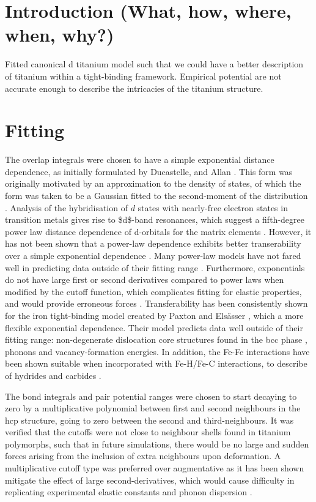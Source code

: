 \documentclass[a4paper,12pt,oneside,print,numbered,index,PageStyleIII]{PhDThesisPSnPDF}
\begin{document}
\section{Introduction (What, how, where, when, why?)}
\label{sec:orgade33e2}
Fitted canonical d titanium model such that we could have a better
description of titanium within a tight-binding framework. Empirical
potential are not accurate enough to describe the intricacies of the
titanium structure.

\section{Fitting}
\label{sec:org3b7394e}

The overlap integrals were chosen to have a simple exponential
distance dependence, as initially formulated by Ducastelle,
\cite{Ducastelle1970c} and Allan \cite{Allan1976}. This form was
originally motivated by an approximation to the density of states,
of which the form was taken to be a Gaussian fitted to the
second-moment of the distribution \cite{Spanjaard1984}. Analysis of
the hybridisation of \(d\) states with nearly-free electron states in
transition metals gives rise to \$d\$-band resonances, which suggest a
fifth-degree power law distance dependence of d-orbitals for the
matrix elements
\cite{Heine1967,Heine1980,Andersen1985,Harrison1989,Pettifor1995}. However, it has
not been shown that a power-law dependence exhibits better
transerability over a simple exponential dependence
\cite{Skinner1991,Paxton2010}. Many power-law models have not
fared well in predicting data outside of their fitting range
\cite{Paxton1987,Paxton1989,Girshick1998a,Trinkle2006,Ferrari2019a}. Furthermore,
exponentials do not have large first or second derivatives compared
to power laws when modified by the cutoff function, which
complicates fitting for elastic properties, and would provide
erroneous forces
\cite{Pashov2012}. Transferability has been consistently
shown for the iron tight-binding model created by Paxton and
Elsässer \cite{Paxton2010}, which a more flexible exponential
dependence. Their model predicts data well outside of their fitting
range: non-degenerate dislocation core structures found in the bcc
phase \cite{Simpsonb,Simpson2020}, phonons and vacancy-formation
energies. In addition, the Fe-Fe interactions have been shown
suitable when incorporated with Fe-H/Fe-C interactions, to describe
of hydrides and carbides \cite{Paxton2010,Paxton2013}.


The bond integrals and pair potential ranges were chosen to start
decaying to zero by a multiplicative polynomial between first and
second neighbours in the hcp structure, going to zero between the
second and third-neighbours. It was verified that the cutoffs were
not close to neighbour shells found in titanium
polymorphs, such that in future simulations, there would be no large
and sudden forces arising from the inclusion of extra neighbours
upon deformation. A multiplicative cutoff type was preferred over
augmentative as it has been shown mitigate the effect of large
second-derivatives, which would cause difficulty in replicating
experimental elastic constants and phonon dispersion
\cite{Pashov2012}.
\end{document}
